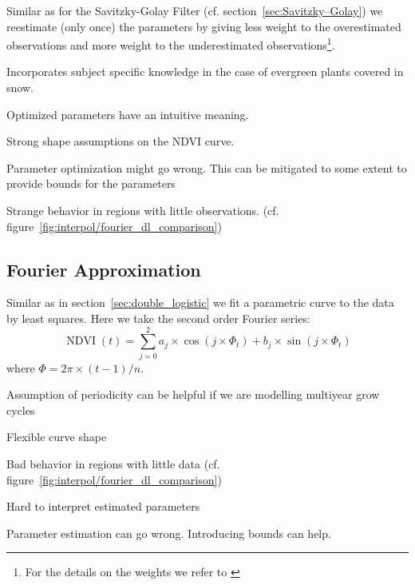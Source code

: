 		Similar as for the Savitzky-Golay Filter (cf. section~\ref{sec:Savitzky–Golay}) we reestimate (only once) the parameters by giving less weight to the overestimated observations and more weight to the underestimated observations\footnote{For the details on the weights we refer to \cite{beckImprovedMonitoringVegetation2006}}.

		\begin{my_pros_cons_table}{
				\item Incorporates subject specific knowledge in the case of evergreen plants covered in snow.
				\item Optimized parameters have an intuitive meaning.
			}{
				\item Strong shape assumptions on the NDVI curve.
				\item Parameter optimization might go wrong. This can be mitigated to some extent to provide bounds for the parameters
				\item Strange behavior in regions with little observations. (cf. figure~\ref{fig:interpol/fourier_dl_comparison})
			}
		\end{my_pros_cons_table}


	\subsection{Fourier Approximation}
		\label{sec:fourier_approx}
		Similar as in section~\ref{sec:double_logistic} we fit a parametric curve to the data by least squares. Here we take the second order Fourier series:
		$$
			\operatorname{NDVI}(t)=\sum_{j=0}^{2} a_{j} \times \cos \left(j \times \Phi_{t}\right)+b_{j} \times \sin \left(j \times \Phi_{t}  \right)
		$$
		where $\Phi=2 \pi \times(t-1) / n$.


		\begin{my_pros_cons_table}{
				\item Assumption of periodicity can be helpful if we are modelling multiyear grow cycles
				\item Flexible curve shape
			}{
				\item Bad behavior in regions with little data (cf. figure~\ref{fig:interpol/fourier_dl_comparison})
				\item Hard to interpret estimated parameters
				\item Parameter estimation can go wrong. Introducing bounds can help.
			}
		\end{my_pros_cons_table}

